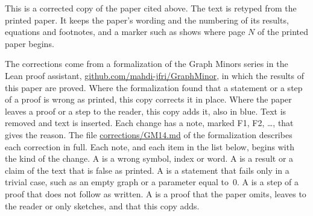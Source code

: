 
This is a corrected copy of the paper cited above. The text is retyped from the printed paper.
It keeps the paper's wording and the numbering of its results, equations and footnotes, and a
marker such as  shows where page $N$ of the printed paper begins.

The corrections come from a formalization of the Graph Minors series in the Lean proof
assistant, \href{https://github.com/mahdi-jfri/GraphMinor}{github.com/mahdi-jfri/GraphMinor},
in which the results of this paper are proved. Where the formalization found that a statement
or a step of a proof is wrong as printed, this copy corrects it in place. Where the paper leaves a proof or a step to the reader, this
copy adds it, also in blue. Text  is removed and text 
is inserted. Each change has a note, marked
\textcolor{fixcolor}{\sffamily F1}, \textcolor{fixcolor}{\sffamily F2}, \dots, that gives the
reason. The file
\href{https://github.com/mahdi-jfri/GraphMinor/blob/main/corrections/GM14.md}{corrections/GM14.md}
of the formalization describes each correction in full. Each note, and each item in the list below, begins with the kind of the change. A  is a wrong symbol, index or word. A  is a result or a claim of the text that is false as printed. A  is a statement that fails only in a trivial case, such as an empty graph or a parameter equal to~$0$. A  is a step of a proof that does not follow as written. A  is a proof that the paper omits, leaves to the reader or only sketches, and that this copy adds.

